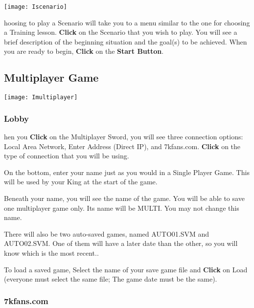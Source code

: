 
\begin{center}
    \texttt{[image: Iscenario]} %
\end{center}

hoosing to play a Scenario will take you to a menu similar to the one for choosing a Training lesson. \textbf{Click} on the Scenario that you wish to play. You will see a brief description of the beginning situation and the goal(s) to be achieved. When you are ready to begin, \textbf{Click} on the \textbf{Start Button}.

\subsection{\textsf{Multiplayer Game}}


\begin{center}
    \texttt{[image: Imultiplayer]} %
\end{center}

\subsubsection{\textsf{Lobby}} %

hen you \textbf{Click} on the Multiplayer Sword, you will see three connection options: Local Area Network, Enter Address (Direct IP), and 7kfans.com. \textbf{Click} on the type of connection that you will be using.

On the bottom, enter your name just as you would in a Single Player Game. This will be used by your King at the start of the game.

Beneath your name, you will see the name of the game. You will be able to save one multiplayer game only. Its name will be MULTI. You may not change this name.

There will also be two auto-saved games, named AUTO01.SVM and AUTO02.SVM. One of them will have a later date than the other, so you will know which is the most recent..

To load a saved game, Select the name of your save game file and \textbf{Click} on Load (everyone must select the same file; The game date must be the same).

\subsubsection{\textsf{7kfans.com}} %

